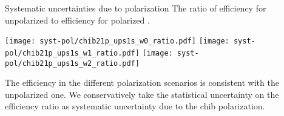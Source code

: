 \begin{frame}{Systematic uncertainties due to \chib polarization}
The ratio of efficiency for unpolarized \chib to efficiency for polarized \chib.

\texttt{[image: syst-pol/chib21p\_ups1s\_w0\_ratio.pdf]}
\texttt{[image: syst-pol/chib21p\_ups1s\_w1\_ratio.pdf]}
\texttt{[image: syst-pol/chib21p\_ups1s\_w2\_ratio.pdf]}

\begin{block}{}
The efficiency in the different polarization scenarios is consistent with the unpolarized one. We conservatively take the statistical uncertainty on the efficiency ratio as systematic uncertainty due to the chib polarization.
\end{block}

\end{frame}